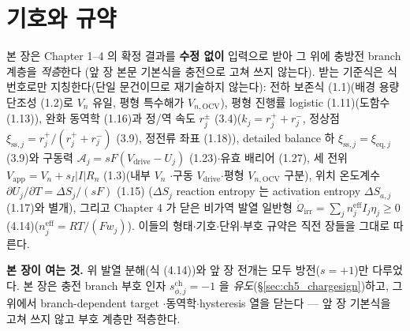\documentclass[11pt,a4paper]{article}
\newcommand{\eff}{\mathrm{eff}}
\newcommand{\eq}{\mathrm{eq}}
\newcommand{\app}{\mathrm{app}}
\newcommand{\drive}{\mathrm{drive}}
\newcommand{\OCV}{\mathrm{OCV}}
\newcommand{\sstat}{\mathrm{ss}}
\newcommand{\irr}{\mathrm{irr}}
\newcommand{\chg}{\mathrm{ch}}
\begin{document}
\section{기호와 규약}\label{sec:ch5_inherit}
본 장은 Chapter 1--4 의 확정 결과를 \textbf{수정 없이} 입력으로 받아 그 위에 충방전 branch 계층을 \emph{적층}한다
(앞 장 본문 기본식을 충전으로 고쳐 쓰지 않는다). 받는 기준식은 식 번호로만 지칭한다(단일 문건이므로 재기술하지
않는다): 전하 보존식 (1.1)(배경 용량 단조성 (1.2)로 $V_n$ 유일, 평형 특수해가 $V_{n,\OCV}$), 평형 진행률 logistic
(1.11)(도함수 (1.13)), 완화 동역학 (1.16)과 정/역 속도 $r_j^\pm$ (3.4)($k_j=r_j^++r_j^-$, 정상점 $\xi_{\sstat,j}
=r_j^+/(r_j^++r_j^-)$ (3.9), 정전류 좌표 (1.18)), detailed balance 하 $\xi_{\sstat,j}=\xi_{\eq,j}$ (3.9)와 구동력
$\mathcal A_j=sF(V_\drive-U_j)$ (1.23)$\cdot$유효 배리어 (1.27), 세 전위 $V_\app=V_n+s_I|I|R_n$ (1.3)(내부 $V_n$
$\cdot$구동 $V_\drive$$\cdot$평형 $V_{n,\OCV}$ 구분), 위치 온도계수 $\partial U_j/\partial T=\Delta S_j/(sF)$ (1.15)
($\Delta S_j$ reaction entropy 는 activation entropy $\Delta S_{a,j}$ (1.17)와 별개), 그리고 Chapter 4 가 닫은
비가역 발열 일반형 $\dot{\mathcal Q}_\irr=\sum_j n_j^{\eff}I_j\eta_j\ge0$ (4.14)($n_j^{\eff}=RT/(Fw_j)$). 이들의
형태$\cdot$기호$\cdot$단위$\cdot$부호 규약은 직전 장들을 그대로 따른다.

\textbf{본 장이 여는 것.} 위 발열 분해(식 (4.14))와 앞 장 전개는 모두 방전($s=+1$)만 다루었다. 본 장은 충전 branch
부호 인자 $s_{\phi,j}^\chg=-1$ 을 \emph{유도}(\S\ref{sec:ch5_chargesign})하고, 그 위에서 branch-dependent target
$\cdot$동역학$\cdot$hysteresis 열을 닫는다 — 앞 장 기본식을 고쳐 쓰지 않고 부호 계층만 적층한다.
\end{document}
